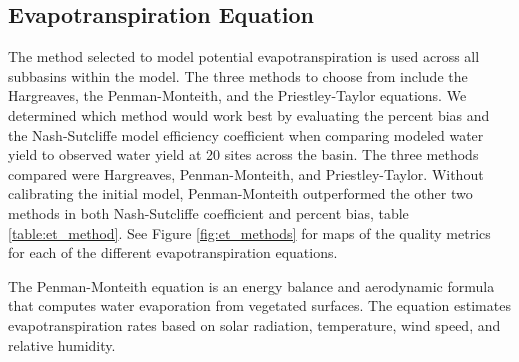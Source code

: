 
\subsection{Evapotranspiration Equation}\label{sec:et_methods}

The method selected to model potential evapotranspiration is used across all subbasins within the model.  The three methods to choose from include the Hargreaves, the Penman-Monteith, and the Priestley-Taylor equations.  We determined which method would work best by evaluating the percent bias and the Nash-Sutcliffe model efficiency coefficient  when comparing modeled water yield to observed water yield at 20 sites across the basin. The three methods compared were Hargreaves, Penman-Monteith, and Priestley-Taylor. Without calibrating the initial model, Penman-Monteith outperformed the other two methods in both Nash-Sutcliffe coefficient and percent bias, table \ref{table:et_method}. See Figure \ref{fig:et_methods} for maps of the quality metrics for each of the different evapotranspiration equations.

The Penman-Monteith equation is an energy balance and aerodynamic formula that computes water evaporation from vegetated surfaces.  The equation estimates evapotranspiration rates based on solar radiation, temperature, wind speed, and relative humidity.


